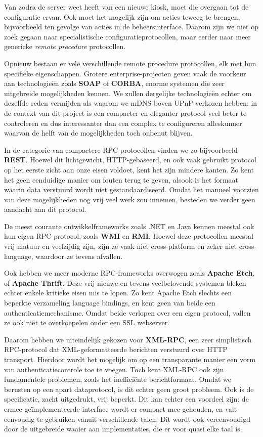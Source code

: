 Van zodra de server weet heeft van een nieuwe kiosk, moet die overgaan tot de configuratie ervan. Ook moet het mogelijk zijn om acties teweeg te brengen, bijvoorbeeld ten gevolge van acties in de beheersinterface. Daarom zijn we niet op zoek gegaan naar specialistische configuratieprotocollen, maar eerder naar meer generieke \emph{remote procedure} protocollen.

Opnieuw bestaan er vele verschillende remote procedure protocollen, elk met hun specifieke eigenschappen. Grotere enterprise-projecten geven vaak de voorkeur aan technologieën zoals \textbf{SOAP} of \textbf{CORBA}, enorme systemen die zeer uitgebreide mogelijkheden kennen. We zullen dergelijke technologieën echter om dezelfde reden vermijden als waarom we mDNS boven UPnP verkozen hebben: in de context van dit project is een compacter en eleganter protocol veel beter te controleren en dus interessanter dan een complex te configureren alleskunner waarvan de helft van de mogelijkheden toch onbenut blijven.

In de categorie van compactere RPC-protocollen vinden we zo bijvoorbeeld \textbf{REST}. Hoewel dit lichtgewicht, HTTP-gebaseerd, en ook vaak gebruikt protocol op het eerste zicht aan onze eisen voldoet, kent het zijn mindere kanten. Zo kent het geen eenduidige manier om fouten terug te geven, alsook is het formaat waarin data verstuurd wordt niet gestandaardiseerd. Omdat het manueel voorzien van deze mogelijkheden nog vrij veel werk zou innemen, besteden we verder geen aandacht aan dit protocol.

De meest courante ontwikkelframeworks zoals .NET en Java kennen meestal ook hun eigen RPC-protocol, zoals \textbf{WMI} en \textbf{RMI}. Hoewel deze protocollen meestal vrij matuur en veelzijdig zijn, zijn ze vaak niet cross-platform en zeker niet cross-language, waardoor ze tevens afvallen.

Ook hebben we meer moderne RPC-frameworks overwogen zoals \textbf{Apache Etch}, of \textbf{Apache Thrift}. Deze vrij nieuwe en tevens veelbelovende systemen bleken echter enkele kritieke eisen mis te lopen. Zo kent Apache Etch slechts een beperkte verzameling language bindings, en kent geen van beide een authenticatiemechanisme. Omdat beide verlopen over een eigen protocol, vallen ze ook niet te overkoepelen onder een SSL webserver.

Daarom hebben we uiteindelijk gekozen voor \textbf{XML-RPC}, een zeer simplistisch RPC-protocol dat XML-geformatteerde berichten verstuurd over HTTP transport. Hierdoor wordt het mogelijk om op een transparante manier een vorm van authenticatiecontrole toe te voegen. Toch kent XML-RPC ook zijn fundamentele problemen, zoals het inefficiënte berichtformaat. Omdat we berusten op een apart dataprotocol, is dit echter geen groot probleem. Ook is de specificatie, zacht uitgedrukt, vrij beperkt. Dit kan echter een voordeel zijn: de ermee geïmplementeerde interface wordt er compact mee gehouden, en valt eenvoudig te gebruiken vanuit verschillende talen. Dit wordt ook vereenvoudigd door de uitgebreide waaier aan implementaties, die er voor quasi elke taal is.

